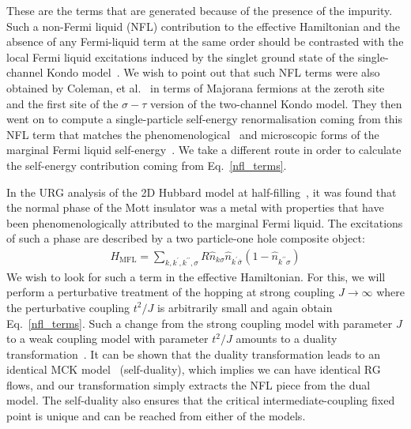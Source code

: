 \documentclass[12pt]{revtex4-2}
\begin{document}
These are the terms that are generated because of the presence of the impurity. Such a non-Fermi liquid (NFL) contribution to the effective Hamiltonian and the absence of any Fermi-liquid term at the same order should be contrasted with the local Fermi liquid excitations induced by the singlet ground state of the single-channel Kondo model~\cite{nozieres1974fermi,wilson1975renormalization,hewson1993}. We wish to point out that such NFL terms were also obtained by Coleman, et al.~\cite{Coleman_tsvelik} in terms of Majorana fermions at the zeroth site and the first site of the \(\sigma-\tau\) version of the two-channel Kondo model. They then went on to compute a single-particle self-energy renormalisation coming from this NFL term that matches the phenomenological~\cite{varma2002singular} and microscopic forms of the marginal Fermi liquid self-energy~\cite{anirbanmott1,anirbanurg1}. We take a different route in order to calculate the self-energy contribution coming from Eq.~\ref{nfl_terms}.

In the URG analysis of the 2D Hubbard model at half-filling~\cite{anirbanurg1}, it was found that the normal phase of the Mott insulator was a metal with properties that have been phenomenologically attributed to the marginal Fermi liquid. The excitations of such a phase are described by a two particle-one hole composite object:
\begin{equation}\begin{aligned}
	\label{mfl_urg}
	H_\text{MFL} = \sum_{k,k^\prime,k^{\prime\prime},\sigma}R \hat n_{k\sigma} \hat n_{k^\prime \overline\sigma}\left(1 - \hat n_{k^{\prime\prime}\sigma}\right) 
\end{aligned}\end{equation}
We wish to look for such a term in the effective Hamiltonian. For this, we will perform a perturbative treatment of the hopping at strong coupling \(J \to \infty\) where the perturbative coupling \(t^2/J\) is arbitrarily small and again obtain Eq.~\ref{nfl_terms}. Such a change from the strong coupling model with parameter \(J\) to a weak coupling model with parameter \(t^2/J\) amounts to a duality transformation~\cite{kroha_kolf_2007,zitko_fabrizio_2017}. It can be shown that the duality transformation leads to an identical MCK model~\cite{kroha_kolf_2007} (self-duality), which implies we can have identical RG flows, and our transformation simply extracts the NFL piece from the dual model. The self-duality also ensures that the critical intermediate-coupling fixed point is unique and can be reached from either of the models.
\end{document}
